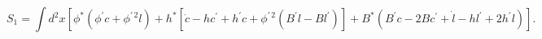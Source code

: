 \begin{equation*}
S_{1}=\int d^{2}x\left[ \phi ^{\ast }\left( \phi ^{\prime }c+\phi ^{\prime
\,2}l\right) +h^{\ast }\left[ \dot{c}-hc^{\prime }+h^{\prime }c+\phi
^{\prime \,2}(B^{\prime }l-Bl^{\prime })\right] +B^{\ast }\left( B^{\prime
}c-2Bc^{\prime }+\dot{l}-hl^{\prime }+2h^{\prime }l\right) \right] .
\end{equation*}

